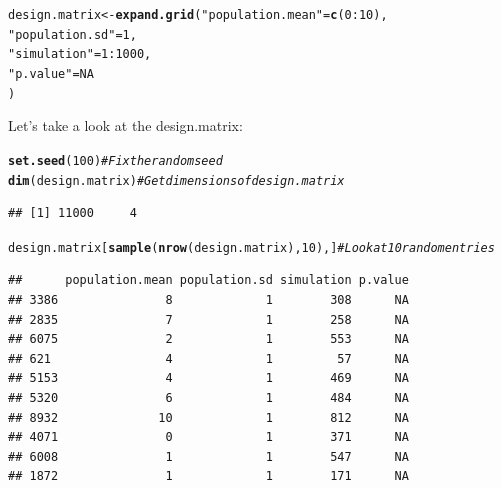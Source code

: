 \documentclass{tufte-book}\usepackage[]{graphicx}\usepackage[]{color}
\makeatletter
\newcommand{\hlnum}[1]{\textcolor[rgb]{0.686,0.059,0.569}{#1}}%
\newcommand{\hlstr}[1]{\textcolor[rgb]{0.192,0.494,0.8}{#1}}%
\newcommand{\hlcom}[1]{\textcolor[rgb]{0.678,0.584,0.686}{\textit{#1}}}%
\newcommand{\hlopt}[1]{\textcolor[rgb]{0,0,0}{#1}}%
\newcommand{\hlstd}[1]{\textcolor[rgb]{0.345,0.345,0.345}{#1}}%
\newcommand{\hlkwb}[1]{\textcolor[rgb]{0.69,0.353,0.396}{#1}}%
\newcommand{\hlkwd}[1]{\textcolor[rgb]{0.737,0.353,0.396}{\textbf{#1}}}%
\newenvironment{kframe}{%
 \def\at@end@of@kframe{}%
 \ifinner\ifhmode%
  \def\at@end@of@kframe{\end{minipage}}%
  \begin{minipage}{\columnwidth}%
 \fi\fi%
 \def\FrameCommand##1{\hskip\@totalleftmargin \hskip-\fboxsep
 \colorbox{shadecolor}{##1}\hskip-\fboxsep
     \hskip-\linewidth \hskip-\@totalleftmargin \hskip\columnwidth}%
 \MakeFramed {\advance\hsize-\width
   \@totalleftmargin\z@ \linewidth\hsize
   \@setminipage}}%
 {\par\unskip\endMakeFramed%
 \at@end@of@kframe}
\newenvironment{knitrout}{}{} %
\makeatother
\begin{document}
\begin{footnotesize}
\begin{knitrout}
\color{fgcolor}\begin{kframe}
\begin{alltt}
\hlstd{design.matrix} \hlkwb{<-} \hlkwd{expand.grid}\hlstd{(}\hlstr{"population.mean"} \hlstd{=} \hlkwd{c}\hlstd{(}\hlnum{0}\hlopt{:}\hlnum{10}\hlstd{),}
                             \hlstr{"population.sd"} \hlstd{=} \hlnum{1}\hlstd{,}
                             \hlstr{"simulation"} \hlstd{=} \hlnum{1}\hlopt{:}\hlnum{1000}\hlstd{,}
                             \hlstr{"p.value"} \hlstd{=} \hlnum{NA}
                             \hlstd{)}
\end{alltt}
\end{kframe}
\end{knitrout}

Let's take a look at the design.matrix:

\begin{knitrout}
\color{fgcolor}\begin{kframe}
\begin{alltt}
\hlkwd{set.seed}\hlstd{(}\hlnum{100}\hlstd{)} \hlcom{# Fix the random seed}
\hlkwd{dim}\hlstd{(design.matrix)} \hlcom{# Get dimensions of design.matrix}
\end{alltt}
\begin{verbatim}
## [1] 11000     4
\end{verbatim}
\begin{alltt}
\hlstd{design.matrix[}\hlkwd{sample}\hlstd{(}\hlkwd{nrow}\hlstd{(design.matrix),} \hlnum{10}\hlstd{),]} \hlcom{# Look at 10 random entries}
\end{alltt}
\begin{verbatim}
##      population.mean population.sd simulation p.value
## 3386               8             1        308      NA
## 2835               7             1        258      NA
## 6075               2             1        553      NA
## 621                4             1         57      NA
## 5153               4             1        469      NA
## 5320               6             1        484      NA
## 8932              10             1        812      NA
## 4071               0             1        371      NA
## 6008               1             1        547      NA
## 1872               1             1        171      NA
\end{verbatim}
\end{kframe}
\end{knitrout}


\end{footnotesize}
\end{document}
